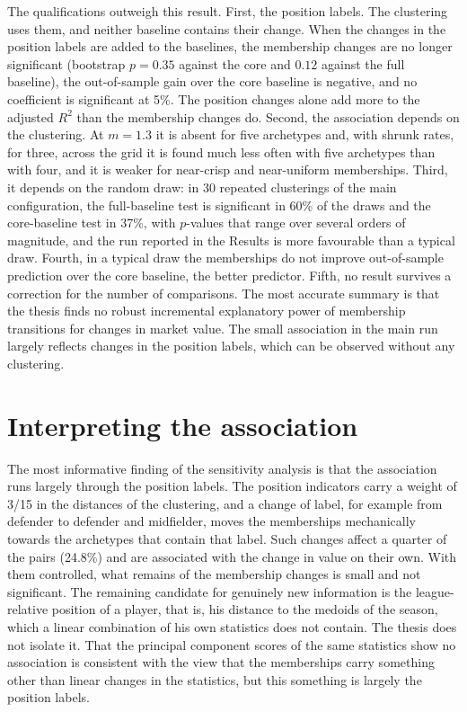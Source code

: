 The qualifications outweigh this result. First, the position labels. The clustering uses them, and neither baseline contains their change. When the changes in the position labels are added to the baselines, the membership changes are no longer significant (bootstrap $p=0.35$ against the core and $0.12$ against the full baseline), the out-of-sample gain over the core baseline is negative, and no coefficient is significant at 5\%. The position changes alone add more to the adjusted $R^2$ than the membership changes do. Second, the association depends on the clustering. At $m=1.3$ it is absent for five archetypes and, with shrunk rates, for three, across the grid it is found much less often with five archetypes than with four, and it is weaker for near-crisp and near-uniform memberships. Third, it depends on the random draw: in 30 repeated clusterings of the main configuration, the full-baseline test is significant in 60\% of the draws and the core-baseline test in 37\%, with $p$-values that range over several orders of magnitude, and the run reported in the Results is more favourable than a typical draw. Fourth, in a typical draw the memberships do not improve out-of-sample prediction over the core baseline, the better predictor. Fifth, no result survives a correction for the number of comparisons. The most accurate summary is that the thesis finds no robust incremental explanatory power of membership transitions for changes in market value. The small association in the main run largely reflects changes in the position labels, which can be observed without any clustering.

\section{Interpreting the association}
\label{sec:disc-fuzziness}

The most informative finding of the sensitivity analysis is that the association runs largely through the position labels. The position indicators carry a weight of 3/15 in the distances of the clustering, and a change of label, for example from defender to defender and midfielder, moves the memberships mechanically towards the archetypes that contain that label. Such changes affect a quarter of the pairs (24.8\%) and are associated with the change in value on their own. With them controlled, what remains of the membership changes is small and not significant. The remaining candidate for genuinely new information is the league-relative position of a player, that is, his distance to the medoids of the season, which a linear combination of his own statistics does not contain. The thesis does not isolate it. That the principal component scores of the same statistics show no association is consistent with the view that the memberships carry something other than linear changes in the statistics, but this something is largely the position labels.

